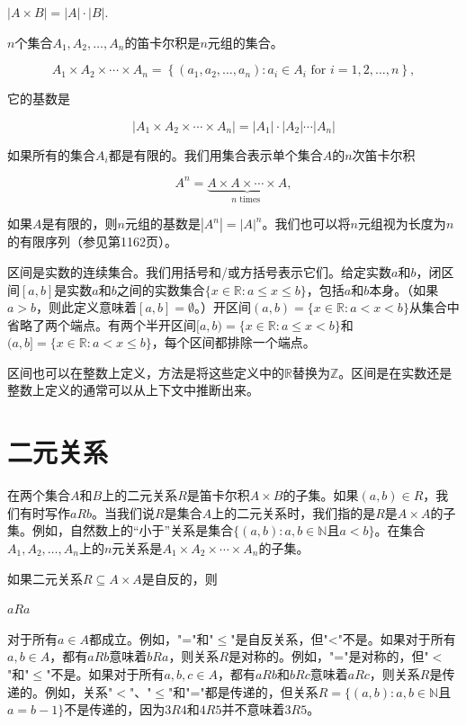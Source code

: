 \documentclass[lang=cn,newtx,10pt,scheme=chinese]{elegantbook}
\begin{document}
$|A \times B|=|A| \cdot|B|$.

$n$个集合$A_1, A_2, \ldots, A_n$的笛卡尔积是$n$元组的集合。

$$
A_1 \times A_2 \times \cdots \times A_n=\left\{\left(a_1, a_2, \ldots, a_n\right): a_i \in A_i \text { for } i=1,2, \ldots, n\right\},
$$

它的基数是

$$
\left|A_1 \times A_2 \times \cdots \times A_n\right|=\left|A_1\right| \cdot\left|A_2\right| \cdots\left|A_n\right|
$$

如果所有的集合$A_i$都是有限的。我们用集合表示单个集合$A$的$n$次笛卡尔积

$$
A^n=\underbrace{A \times A \times \cdots \times A}_{n \text { times }},
$$

如果$A$是有限的，则$n$元组的基数是$\left|A^n\right|=|A|^n$。我们也可以将$n$元组视为长度为$n$的有限序列（参见第1162页）。

区间是实数的连续集合。我们用括号和/或方括号表示它们。给定实数$a$和$b$，闭区间$[a, b]$是实数$a$和$b$之间的实数集合$\{x \in \mathbb{R}: a \leq x \leq b\}$，包括$a$和$b$本身。（如果$a>b$，则此定义意味着$[a, b]=\emptyset$。）开区间$(a, b)=\{x \in \mathbb{R}: a<x<b\}$从集合中省略了两个端点。有两个半开区间$[a, b)=\{x \in \mathbb{R}: a \leq x<b\}$和$(a, b]=\{x \in \mathbb{R}: a<x \leq b\}$，每个区间都排除一个端点。

区间也可以在整数上定义，方法是将这些定义中的$\mathbb{R}$替换为$\mathbb{Z}$。区间是在实数还是整数上定义的通常可以从上下文中推断出来。

\section{二元关系}

在两个集合$A$和$B$上的二元关系$R$是笛卡尔积$A \times B$的子集。如果$(a, b) \in R$，我们有时写作$a R b$。当我们说$R$是集合$A$上的二元关系时，我们指的是$R$是$A \times A$的子集。例如，自然数上的“小于”关系是集合$\{(a, b): a, b \in \mathbb{N}$且$a<b\}$。在集合$A_1, A_2, \ldots, A_n$上的$n$元关系是$A_1 \times A_2 \times \cdots \times A_n$的子集。

如果二元关系$R \subseteq A \times A$是自反的，则

$a R a$

对于所有$a \in A$都成立。例如，"="和"$\leq$"是自反关系，但"<"不是。如果对于所有$a, b \in A$，都有$a R b$意味着$b R a$，则关系$R$是对称的。例如，"="是对称的，但"$<$"和"$\leq$"不是。如果对于所有$a, b, c \in A$，都有$a R b$和$b R c$意味着$a R c$，则关系$R$是传递的。例如，关系"$<$"、"$\leq$"和"="都是传递的，但关系$R=\{(a, b): a, b \in \mathbb{N}$且$a=b-1\}$不是传递的，因为$3 R 4$和$4 R 5$并不意味着$3 R 5$。
\end{document}
